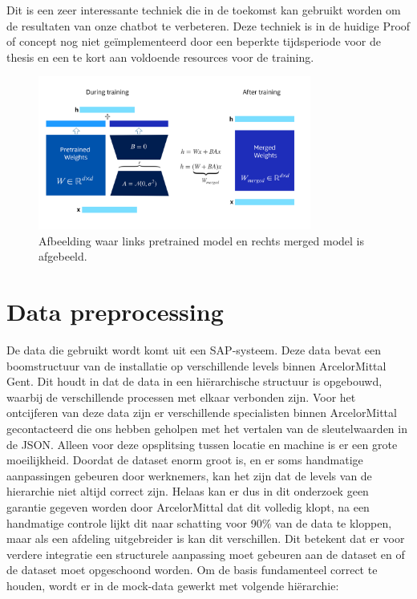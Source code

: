 Dit is een zeer interessante techniek die in de toekomst kan gebruikt worden om de resultaten van onze chatbot te verbeteren.
Deze techniek is in de huidige Proof of concept nog niet geïmplementeerd door een beperkte tijdsperiode voor de thesis en een te kort aan voldoende resources voor de training.

\begin{figure}[H]
     \centering
     \includegraphics[width=0.8\textwidth]{./img/lora.png}
     \caption[Lora principe.]{\label{fig:lora}Afbeelding waar links pretrained model en rechts merged model is afgebeeld.}
\end{figure}

\section{Data preprocessing}
De data die gebruikt wordt komt uit een SAP-systeem. Deze data bevat een boomstructuur van de installatie op verschillende levels binnen ArcelorMittal Gent.
Dit houdt in dat de data in een hiërarchische structuur is opgebouwd, waarbij de verschillende processen met elkaar verbonden zijn.
Voor het ontcijferen van deze data zijn er verschillende specialisten binnen ArcelorMittal gecontacteerd die ons hebben geholpen met het vertalen van de sleutelwaarden in de JSON.\@
Alleen voor deze opsplitsing tussen locatie en machine is er een grote moeilijkheid. Doordat de dataset enorm groot is, en er soms handmatige aanpassingen gebeuren door werknemers, kan het zijn dat de levels van de hierarchie niet altijd correct zijn. 
Helaas kan er dus in dit onderzoek geen garantie gegeven worden door ArcelorMittal dat dit volledig klopt, na een handmatige controle lijkt dit naar schatting voor 90\% van de data te kloppen, maar als een afdeling uitgebreider is kan dit verschillen.
Dit betekent dat er voor verdere integratie een structurele aanpassing moet gebeuren aan de dataset en of de dataset moet opgeschoond worden.
Om de basis fundamenteel correct te houden, wordt er in de mock-data gewerkt met volgende hiërarchie:

